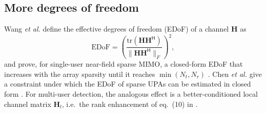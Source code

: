 \documentclass[11pt]{article}
\begin{document}
\subsection{More degrees of freedom}
Wang \emph{et al.} define the effective degrees of freedom (EDoF) of a channel $\mathbf H$ as \cite[eq.~(13)]{wang2024sparsemimo}
\begin{equation}
  \mathrm{EDoF}=\left(\frac{\mathrm{tr}(\mathbf H\mathbf H^{\mathsf H})}{\|\mathbf H\mathbf H^{\mathsf H}\|_F}\right)^2,
  \label{eq:edof}
\end{equation}
and prove, for single-user near-field sparse MIMO, a closed-form EDoF that increases with the array sparsity until it reaches $\min(N_t,N_r)$ \cite{wang2024sparsemimo}. Chen \emph{et al.} give a constraint under which the EDoF of sparse UPAs can be estimated in closed form \cite{chen2025exploring}. For multi-user detection, the analogous effect is a better-conditioned local channel matrix $\mathbf H_l$, i.e.\ the rank enhancement of eq.~(10) in \cite{haider2026vtc}.
\end{document}
